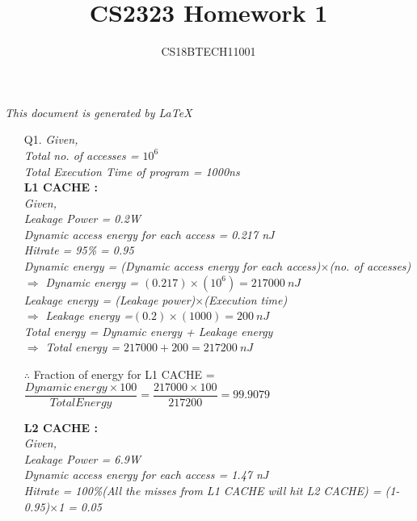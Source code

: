 \documentclass[letterpaper]{article}
\title{CS2323 Homework 1}
\author{CS18BTECH11001}
\begin{document}
\maketitle
\begin{large}
\begin{center}
\textit{This document is generated by \LaTeX}
\end{center}
\begin{flushleft}
\begin{enumerate}

\item[Q1.]
\textit{Given,\\[0.1in] Total no. of accesses = $10^6$\\[0.1in]
Total Execution Time of program = 1000ns \\[0.2in]}
\textbf{L1 CACHE : }\\[0.1in]
\textit{Given,\\[0.1in] Leakage Power = 0.2W \\[0.1in] Dynamic access energy for each access = 0.217 nJ \\[0.05in] Hitrate = 95\% = 0.95 \\[0.1in]}
\textit{Dynamic energy = (Dynamic access energy for each access)$\times$(no. of accesses)}\\[0.1in]
\qquad\textit{$\Rightarrow$ Dynamic energy = $(0.217)\times(10^6) = 217000\:nJ$}\\[0.1in]
\textit{Leakage energy = (Leakage power)$\times$(Execution time)}\\[0.1in]
\qquad\textit{$\Rightarrow$ Leakage energy =$(0.2)\times(1000) = 200\:nJ$}\\[0.1in]
\textit{Total energy = Dynamic energy + Leakage energy}\\[0.1in]
\qquad\textit{$\Rightarrow$ Total energy = $217000 + 200 = 217200\:nJ$}\\[0.1in]
\begin{center}
$\therefore$ Fraction of energy for L1 CACHE = $\dfrac{Dynamic\ energy \times 100}{Total Energy} = \dfrac{217000 \times 100}{217200} = 99.9079$\\[0.2in]
\end{center}
\textbf{L2 CACHE : }\\[0.1in]
\textit{Given,\\[0.05in] Leakage Power = 6.9W \\[0.1in] Dynamic access energy for each access = 1.47 nJ \\[0.1in] Hitrate = 100\%(All the misses from L1 CACHE will hit L2 CACHE) = (1-0.95)$\times$1 = 0.05 \\[0.1in]}

\end{enumerate}
\end{flushleft}
\end{large}
\end{document}

